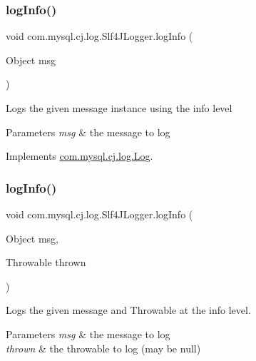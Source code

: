 \subsubsection{\texorpdfstring{log\+Info()}{logInfo()}\hspace{0.1cm}{\footnotesize\ttfamily [1/2]}}
{\footnotesize\ttfamily void com.\+mysql.\+cj.\+log.\+Slf4\+J\+Logger.\+log\+Info (\begin{DoxyParamCaption}\item[{Object}]{msg }\end{DoxyParamCaption})}

Logs the given message instance using the \textquotesingle{}info\textquotesingle{} level


\begin{DoxyParams}{Parameters}
{\em msg} & the message to log \\
\hline
\end{DoxyParams}


Implements \mbox{\hyperlink{interfacecom_1_1mysql_1_1cj_1_1log_1_1_log_a7f117433067520dd682da12ff9194f4b}{com.\+mysql.\+cj.\+log.\+Log}}.

\mbox{\label{classcom_1_1mysql_1_1cj_1_1log_1_1_slf4_j_logger_ad6eaf1dfaaa8f7f4c7a092852a4add0f}} 
\subsubsection{\texorpdfstring{log\+Info()}{logInfo()}\hspace{0.1cm}{\footnotesize\ttfamily [2/2]}}
{\footnotesize\ttfamily void com.\+mysql.\+cj.\+log.\+Slf4\+J\+Logger.\+log\+Info (\begin{DoxyParamCaption}\item[{Object}]{msg,  }\item[{Throwable}]{thrown }\end{DoxyParamCaption})}

Logs the given message and Throwable at the \textquotesingle{}info\textquotesingle{} level.


\begin{DoxyParams}{Parameters}
{\em msg} & the message to log \\
\hline
{\em thrown} & the throwable to log (may be null) \\
\hline
\end{DoxyParams}


